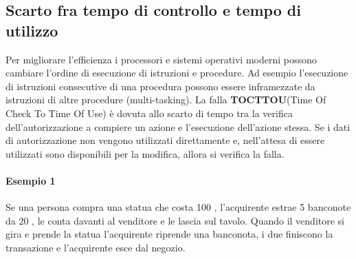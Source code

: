 \subsection{Scarto fra tempo di controllo e tempo di utilizzo}
Per migliorare l'efficienza i processori e sistemi operativi moderni possono cambiare l'ordine di esecuzione di istruzioni e procedure. Ad esempio l'esecuzione di istruzioni consecutive di una procedura possono essere inframezzate da istruzioni di altre procedure (multi-tasking).
\newline \newline
La falla \textbf{TOCTTOU}(Time Of Check To Time Of Use) è dovuta allo scarto di tempo tra la verifica dell'autorizzazione a compiere un azione e l'esecuzione dell'azione stessa. Se i dati di autorizzazione non vengono utilizzati direttamente e, nell'attesa di essere utilizzati sono disponibili per la modifica, allora si verifica la falla.
\paragraph{Esempio 1} 
Se una persona compra una statua che costa 100 \officialeuro, l'acquirente estrae 5 banconote da 20 \officialeuro, le conta davanti al venditore e le lascia sul tavolo. Quando il venditore si gira e prende la statua l'acquirente riprende una banconota, i due finiscono la transazione e l'acquirente esce dal negozio.

